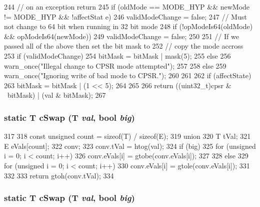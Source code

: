 \begin{DoxyCode}
{{{{244                     // on an exception return
245                     if (oldMode == MODE_HYP && newMode != MODE_HYP && !affectStat
      e)
246                         validModeChange = false;
247                     // Must not change to 64 bit when running in 32 bit mode
248                     if (!opModeIs64(oldMode) && opModeIs64(newMode))
249                         validModeChange = false;
250 
251                     // If we passed all of the above then set the bit mask to
252                     // copy the mode accross
253                     if (validModeChange) {
254                         bitMask = bitMask | mask(5);
255                     } else {
256                         warn_once("Illegal change to CPSR mode attempted\n");
257                     }
258                 } else {
259                     warn_once("Ignoring write of bad mode to CPSR.\n");
260                 }
261             }
262             if (affectState)
263                 bitMask = bitMask | (1 << 5);
264         }
265 
266         return ((uint32_t)cpsr & ~bitMask) | (val & bitMask);
267     }
\end{DoxyCode}
\hypertarget{classArmISA_1_1ArmStaticInst_acf3e010f3f922cce3330ad7e69133c5f}{
\subsubsection[{cSwap}]{\setlength{\rightskip}{0pt plus 5cm}static T cSwap (T {\em val}, \/  bool {\em big})}}
\label{classArmISA_1_1ArmStaticInst_acf3e010f3f922cce3330ad7e69133c5f}



\begin{DoxyCode}
317     {
318         const unsigned count = sizeof(T) / sizeof(E);
319         union {
320             T tVal;
321             E eVals[count];
322         } conv;
323         conv.tVal = htog(val);
324         if (big) {
325             for (unsigned i = 0; i < count; i++) {
326                 conv.eVals[i] = gtobe(conv.eVals[i]);
327             }
328         } else {
329             for (unsigned i = 0; i < count; i++) {
330                 conv.eVals[i] = gtole(conv.eVals[i]);
331             }
332         }
333         return gtoh(conv.tVal);
334     }
\end{DoxyCode}
\hypertarget{classArmISA_1_1ArmStaticInst_acf3e010f3f922cce3330ad7e69133c5f}{
\subsubsection[{cSwap}]{\setlength{\rightskip}{0pt plus 5cm}static T cSwap (T {\em val}, \/  bool {\em big})}}
\label{classArmISA_1_1ArmStaticInst_acf3e010f3f922cce3330ad7e69133c5f}



